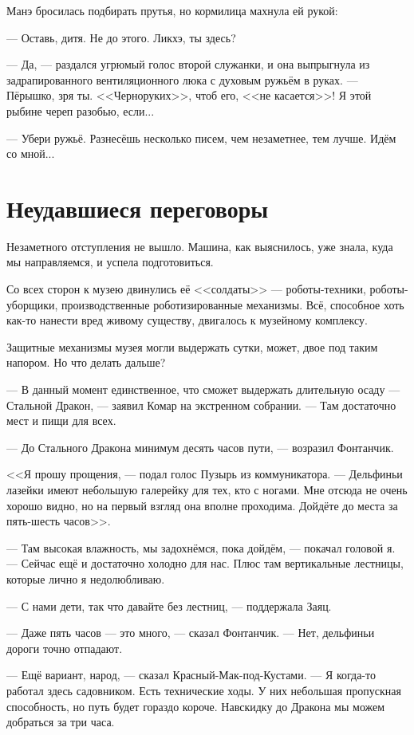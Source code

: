 Манэ бросилась подбирать прутья, но кормилица махнула ей рукой:

--- Оставь, дитя.
Не до этого.
Ликхэ, ты здесь?

--- Да, --- раздался угрюмый голос второй служанки, и она выпрыгнула из задрапированного вентиляционного люка с духовым ружьём в руках.
--- Пёрышко, зря ты.
<<Черноруких>>, чтоб его, <<не касается>>!
Я этой рыбине череп разобью, если...

--- Убери ружьё.
Разнесёшь несколько писем, чем незаметнее, тем лучше.
Идём со мной...

\section{Неудавшиеся переговоры}

Незаметного отступления не вышло.
Машина, как выяснилось, уже знала, куда мы направляемся, и успела подготовиться.

Со всех сторон к музею двинулись её <<солдаты>> --- роботы-техники, роботы-уборщики, производственные роботизированные механизмы.
Всё, способное хоть как-то нанести вред живому существу, двигалось к музейному комплексу.

Защитные механизмы музея могли выдержать сутки, может, двое под таким напором.
Но что делать дальше?

--- В данный момент единственное, что сможет выдержать длительную осаду --- Стальной Дракон, --- заявил Комар на экстренном собрании.
--- Там достаточно мест и пищи для всех.

--- До Стального Дракона минимум десять часов пути, --- возразил Фонтанчик.

<<Я прошу прощения, --- подал голос Пузырь из коммуникатора.
--- Дельфиньи лазейки имеют небольшую галерейку для тех, кто с ногами.
Мне отсюда не очень хорошо видно, но на первый взгляд она вполне проходима.
Дойдёте до места за пять-шесть часов>>.

--- Там высокая влажность, мы задохнёмся, пока дойдём, --- покачал головой я.
--- Сейчас ещё и достаточно холодно для нас.
Плюс там вертикальные лестницы, которые лично я недолюбливаю.

--- С нами дети, так что давайте без лестниц, --- поддержала Заяц.

--- Даже пять часов --- это много, --- сказал Фонтанчик.
--- Нет, дельфиньи дороги точно отпадают.

--- Ещё вариант, народ, --- сказал Красный-Мак-под-Кустами.
--- Я когда-то работал здесь садовником.
Есть технические ходы.
У них небольшая пропускная способность, но путь будет гораздо короче.
Навскидку до Дракона мы можем добраться за три часа.

